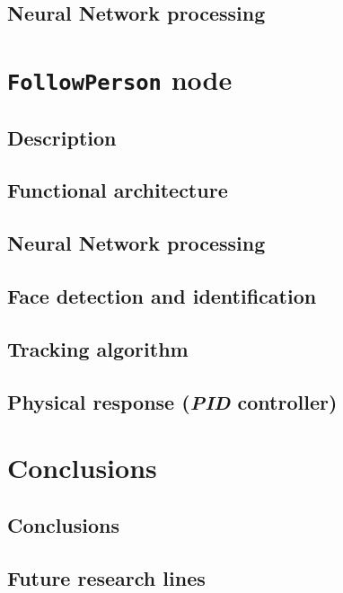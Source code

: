 \section{Neural Network processing}


\chapter{\texttt{FollowPerson} node}
\label{chap:followperson}
\section{Description}
\section{Functional architecture}
\section{Neural Network processing}
\section{Face detection and identification}
\section{Tracking algorithm}
\section{Physical response (\emph{PID} controller)}



\chapter{Conclusions}
	\section{Conclusions}
	\section{Future research lines}